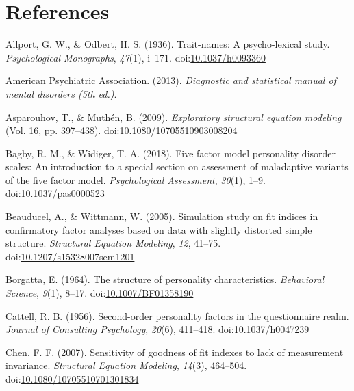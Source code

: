 \documentclass[,man,floatsintext]{apa6}
\theoremstyle{definition}
\theoremstyle{definition}
\theoremstyle{definition}
\theoremstyle{remark}
\begin{document}
\newpage

\hypertarget{references}{%
\section{References}\label{references}}

\begingroup
\setlength{\parindent}{-0.5in}
\setlength{\leftskip}{0.5in}

\hypertarget{refs}{}
\leavevmode\hypertarget{ref-AllportOdbert1936}{}%
Allport, G. W., \& Odbert, H. S. (1936). Trait-names: A psycho-lexical
study. \emph{Psychological Monographs}, \emph{47}(1), i--171.
doi:\href{https://doi.org/10.1037/h0093360}{10.1037/h0093360}

\leavevmode\hypertarget{ref-APA2013}{}%
American Psychiatric Association. (2013). \emph{Diagnostic and
statistical manual of mental disorders (5th ed.)}.

\leavevmode\hypertarget{ref-AsparouhovMuthen2009}{}%
Asparouhov, T., \& Muthén, B. (2009). \emph{Exploratory structural
equation modeling} (Vol. 16, pp. 397--438).
doi:\href{https://doi.org/10.1080/10705510903008204}{10.1080/10705510903008204}

\leavevmode\hypertarget{ref-Bagby2018}{}%
Bagby, R. M., \& Widiger, T. A. (2018). Five factor model personality
disorder scales: An introduction to a special section on assessment of
maladaptive variants of the five factor model. \emph{Psychological
Assessment}, \emph{30}(1), 1--9.
doi:\href{https://doi.org/10.1037/pas0000523}{10.1037/pas0000523}

\leavevmode\hypertarget{ref-Beauducel2005}{}%
Beauducel, A., \& Wittmann, W. (2005). Simulation study on fit indices
in confirmatory factor analyses based on data with slightly distorted
simple structure. \emph{Structural Equation Modeling}, \emph{12},
41--75.
doi:\href{https://doi.org/10.1207/s15328007sem1201}{10.1207/s15328007sem1201}

\leavevmode\hypertarget{ref-Borgatta1964}{}%
Borgatta, E. (1964). The structure of personality characteristics.
\emph{Behavioral Science}, \emph{9}(1), 8--17.
doi:\href{https://doi.org/10.1007/BF01358190}{10.1007/BF01358190}

\leavevmode\hypertarget{ref-Cattell1956}{}%
Cattell, R. B. (1956). Second-order personality factors in the
questionnaire realm. \emph{Journal of Consulting Psychology},
\emph{20}(6), 411--418.
doi:\href{https://doi.org/10.1037/h0047239}{10.1037/h0047239}

\leavevmode\hypertarget{ref-Chen2007}{}%
Chen, F. F. (2007). Sensitivity of goodness of fit indexes to lack of
measurement invariance. \emph{Structural Equation Modeling},
\emph{14}(3), 464--504.
doi:\href{https://doi.org/10.1080/10705510701301834}{10.1080/10705510701301834}
\end{document}
